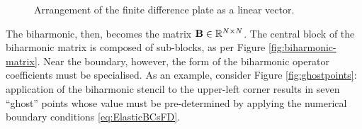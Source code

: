 \begin{figure}
    
    \caption{Arrangement of the finite difference plate as a linear vector.}
    \label{fig:fdtd-linear}
\end{figure}
The biharmonic, then, becomes the matrix ${\bf B}\in {\mathbb R}^{N\times N}$. The central block of the biharmonic matrix is composed of sub-blocks, as per Figure \ref{fig:biharmonic-matrix}. Near the boundary, however, the form of the biharmonic operator coefficients must be specialised. As an example, consider Figure \ref{fig:ghostpoints}: application of the biharmonic stencil to the upper-left corner results in seven ``ghost'' points whose value must be pre-determined by applying the numerical boundary conditions \eqref{eq:ElasticBCsFD}. 
